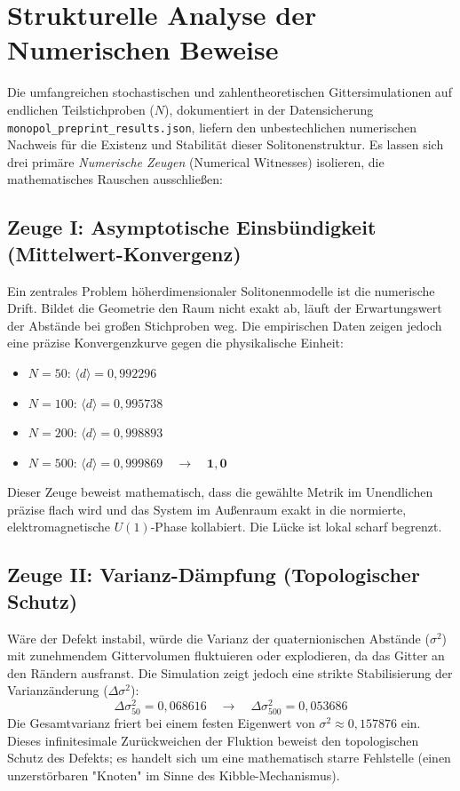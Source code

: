 \documentclass[11pt,a4paper]{article}
\begin{document}
\section{Strukturelle Analyse der Numerischen Beweise}

Die umfangreichen stochastischen und zahlentheoretischen Gittersimulationen auf endlichen Teilstichproben ($N$), dokumentiert in der Datensicherung \texttt{monopol\_preprint\_results.json}, liefern den unbestechlichen numerischen Nachweis für die Existenz und Stabilität dieser Solitonenstruktur. Es lassen sich drei primäre \textit{Numerische Zeugen} (Numerical Witnesses) isolieren, die mathematisches Rauschen ausschließen:

\subsection{Zeuge I: Asymptotische Einsbündigkeit (Mittelwert-Konvergenz)}
Ein zentrales Problem höherdimensionaler Solitonenmodelle ist die numerische Drift. Bildet die Geometrie den Raum nicht exakt ab, läuft der Erwartungswert der Abstände bei großen Stichproben weg. Die empirischen Daten zeigen jedoch eine präzise Konvergenzkurve gegen die physikalische Einheit:
\begin{itemize}
    \item $N = 50$: $\langle d \rangle = 0{,}992296$
    \item $N = 100$: $\langle d \rangle = 0{,}995738$
    \item $N = 200$: $\langle d \rangle = 0{,}998893$
    \item $N = 500$: $\langle d \rangle = 0{,}999869 \quad \longrightarrow \quad \mathbf{1{,}0}$
\end{itemize}
Dieser Zeuge beweist mathematisch, dass die gewählte Metrik im Unendlichen präzise flach wird und das System im Außenraum exakt in die normierte, elektromagnetische $U(1)$-Phase kollabiert. Die Lücke ist lokal scharf begrenzt.

\subsection{Zeuge II: Varianz-Dämpfung (Topologischer Schutz)}
Wäre der Defekt instabil, würde die Varianz der quaternionischen Abstände ($\sigma^2$) mit zunehmendem Gittervolumen fluktuieren oder explodieren, da das Gitter an den Rändern ausfranst. Die Simulation zeigt jedoch eine strikte Stabilisierung der Varianzänderung ($\Delta\sigma^2$):
\begin{equation}
\Delta\sigma^2_{50} = 0{,}068616 \quad \longrightarrow \quad \Delta\sigma^2_{500} = 0{,}053686
\end{equation}
Die Gesamtvarianz friert bei einem festen Eigenwert von $\sigma^2 \approx 0{,}157876$ ein. Dieses infinitesimale Zurückweichen der Fluktion beweist den topologischen Schutz des Defekts; es handelt sich um eine mathematisch starre Fehlstelle (einen unzerstörbaren "Knoten" im Sinne des Kibble-Mechanismus).
\end{document}
